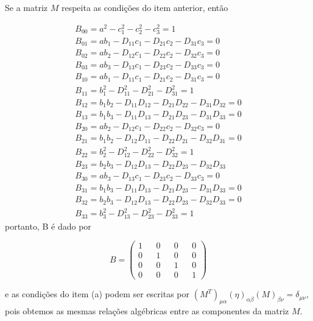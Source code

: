 \documentclass[10pt,a4paper]{article}
\begin{document}
Se a matriz $ M $ respeita as condições do item anterior, então

\begin{eqnarray}
	B_{00} = a^2 -c_1^2 - c_2^2 - c_3^2 =1\nonumber\\
	B_{01} = ab_1 - D_{11}c_1 - D_{21}c_2 - D_{31}c_3=0 \nonumber\\
	B_{02} = ab_2 - D_{12}c_1 - D_{22}c_2 - D_{32}c_3=0 \nonumber\\
	B_{03} = ab_3 - D_{13}c_1 - D_{23}c_2 - D_{33}c_3=0 \nonumber\\
	B_{10} = ab_1 - D_{11}c_1 - D_{21}c_2 - D_{31}c_3=0 \nonumber\\
	B_{11} = b_1^2 - D_{11}^2 - D_{21}^2 - D_{31}^2=1 \nonumber\\
	B_{12} = b_1b_2 - D_{11}D_{12} - D_{21}D_{22} - D_{31}D_{32} =0\nonumber\\
	B_{13} = b_1b_3 - D_{11}D_{13} - D_{21}D_{23} - D_{31}D_{33}=0 \nonumber\\
	B_{20} = ab_2 - D_{12}c_1 - D_{22}c_2 - D_{32}c_3=0 \nonumber\\
	B_{21} = b_1b_2 - D_{12}D_{11} - D_{22}D_{21} - D_{32}D_{31}=0 \nonumber\\
	B_{22} = b_2^2 - D_{12}^2 - D_{22}^2 - D_{32}^2=1 \nonumber\\
	B_{23} = b_2b_3 - D_{12}D_{13} - D_{22}D_{23} - D_{32}D_{33} \nonumber\\
	B_{30} = ab_3 - D_{13}c_1 - D_{23}c_2 - D_{33}c_3 =0\nonumber\\
	B_{31} = b_1b_3 - D_{11}D_{13} - D_{21}D_{23} - D_{31}D_{33} =0\nonumber\\
	B_{32} = b_2b_3 - D_{12}D_{13} - D_{22}D_{23} - D_{32}D_{33}=0 \nonumber\\
	B_{33} = b_3^2 - D_{13}^2 - D_{23}^2 - D_{33}^2 =1 \nonumber
\end{eqnarray}
portanto, B é dado por

$$B = \left(\begin{matrix}
	1&&0&&0&&0\\
	0&&1&&0&&0\\
	0&&0&&1&&0\\
	0&&0&&0&&1
\end{matrix}\right)$$

e as condições do item (a) podem ser escritas por $ (M^T)_{\mu\alpha} (\eta)_{\alpha\beta} (M)_{\beta\nu }= \delta_{\mu\nu} $, pois obtemos as mesmas relações algébricas entre as componentes da matriz $ M $.

 
\end{document}
